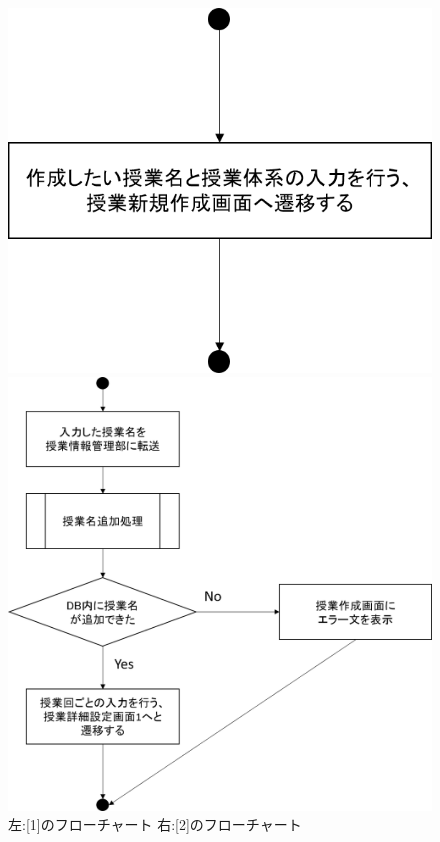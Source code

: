 \begin{figure}[htbp]
 \begin{minipage}{0.5\hsize}
  \begin{center}
   \includegraphics[width=0.5\linewidth,clip]{./img/create_lecture/sub1.png}
  \end{center}
 \end{minipage}
 \begin{minipage}{0.5\hsize}
  \begin{center}
   \includegraphics[width=1\linewidth,clip]{./img/create_lecture/sub2.png}
  \end{center}
 \end{minipage}
 \caption{左:[1]のフローチャート 右:[2]のフローチャート}\label{fig:createlectureflow0}
\end{figure}

